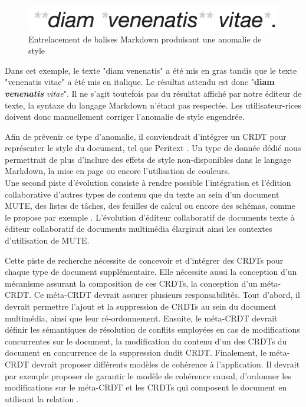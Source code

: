 \begin{figure}
    \centering
    \includegraphics[width=0.5\columnwidth]{img/screenshot-mute-interleaving-markdown}
    \caption{Entrelacement de balises Markdown produisant une anomalie de style}
    \label{fig:mute-interleaving-markdown}
\end{figure}

Dans cet exemple, le texte "diam venenatis" a été mis en gras tandis que le texte "venenatis vitae" a été mis en italique.
Le résultat attendu est donc "\textbf{diam \emph{venenatis}} \emph{vitae}".
Il ne s'agit toutefois pas du résultat affiché par notre éditeur de texte, la syntaxe du langage Markdown n'étant pas respectée.
Les utilisateur-rices doivent donc manuellement corriger l'anomalie de style engendrée.

Afin de prévenir ce type d'anomalie, il conviendrait d'intégrer un \ac{CRDT} pour représenter le style du document, tel que Peritext \cite{2022-peritext-litt}.
Un type de donnée dédié nous permettrait de plus d'inclure des effets de style non-disponibles dans le langage Markdown, \eg la mise en page ou encore l'utilisation de couleurs.\\

Une second piste d'évolution consiste à rendre possible l'intégration et l'édition collaborative d'autres types de contenu que du texte au sein d'un document \ac{MUTE}, \eg des listes de tâches, des feuilles de calcul ou encore des schémas, comme le propose par exemple \cite{dropbox-paper}.
L'évolution d'éditeur collaboratif de documents texte à éditeur collaboratif de documents multimédia élargirait ainsi les contextes d'utilisation de \ac{MUTE}.

Cette piste de recherche nécessite de concevoir et d'intégrer des \acp{CRDT} pour chaque type de document supplémentaire.
Elle nécessite aussi la conception d'un mécanisme assurant la composition de ces \acp{CRDT}, \ie la conception d'un méta-\ac{CRDT}.
Ce méta-\ac{CRDT} devrait assurer plusieurs responsabilités.
Tout d'abord, il devrait permettre l'ajout et la suppression de \acp{CRDT} au sein du document multimédia, ainsi que leur ré-ordonnement.
Ensuite, le méta-\ac{CRDT} devrait définir les sémantiques de résolution de conflits employées en cas de modifications concurrentes sur le document, \eg la modification du contenu d'un des \acp{CRDT} du document en concurrence de la suppression dudit \ac{CRDT}.
Finalement, le méta-\ac{CRDT} devrait proposer différents modèles de cohérence à l'application.
Il devrait par exemple proposer de garantir le modèle de cohérence causal, \ie d'ordonner les modifications sur le méta-\ac{CRDT} et les \acp{CRDT} qui composent le document en utilisant la relation \hb {}.

